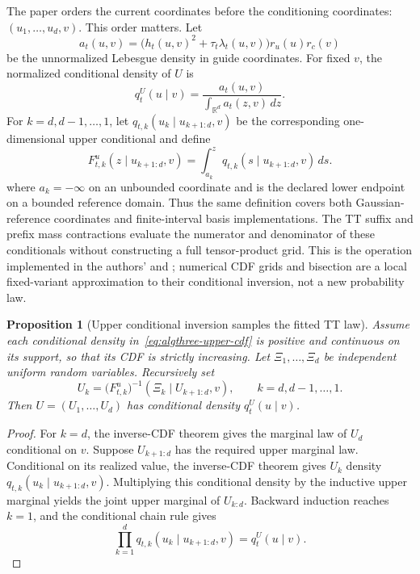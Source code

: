 \documentclass[11pt]{article}
\newtheorem{proposition}{Proposition}
\begin{document}
The paper orders the current coordinates before the conditioning coordinates:
$(u_1,\ldots,u_d,v)$.  This order matters.  Let
\begin{equation}
 a_t(u,v)=\bigl(h_t(u,v)^2+\tau_t\lambda_t(u,v)\bigr)r_u(u)r_c(v)
 \label{eq:algthree-lebesgue-amplitude-density}
\end{equation}
be the unnormalized Lebesgue density in guide coordinates.  For fixed $v$,
the normalized conditional density of $U$ is
\begin{equation}
 q_t^U(u\mid v)
 =\frac{a_t(u,v)}{\displaystyle\int_{\mathbb R^d}a_t(z,v)\,dz}.
 \label{eq:algthree-guide-conditional}
\end{equation}
For $k=d,d-1,\ldots,1$, let
$q_{t,k}(u_k\mid u_{k+1:d},v)$ be the corresponding one-dimensional upper
conditional and define
\begin{equation}
 F_{t,k}^u(z\mid u_{k+1:d},v)
 =\int_{a_k}^{z}
 q_{t,k}(s\mid u_{k+1:d},v)\,ds.
 \label{eq:algthree-upper-cdf}
\end{equation}
where $a_k=-\infty$ on an unbounded coordinate and is the declared lower
endpoint on a bounded reference domain.  Thus the same definition covers both
Gaussian-reference coordinates and finite-interval basis implementations.
The TT suffix and prefix mass contractions evaluate the numerator and
denominator of these conditionals without constructing a full tensor-product
grid.  This is the operation implemented in the authors'
 and
; numerical CDF grids and bisection are a
local fixed-variant approximation to their conditional inversion, not a new
probability law.

\begin{proposition}[Upper conditional inversion samples the fitted TT law]
\label{prop:algthree-upper-kr}
Assume each conditional density in~\eqref{eq:algthree-upper-cdf} is positive
and continuous on its support, so that its CDF is strictly increasing.  Let
$\Xi_1,\ldots,\Xi_d$ be independent uniform random variables.  Recursively set
\begin{equation}
 U_k=\bigl(F_{t,k}^u\bigr)^{-1}
       (\Xi_k\mid U_{k+1:d},v),
 \qquad k=d,d-1,\ldots,1.
 \label{eq:algthree-upper-inverse}
\end{equation}
Then $U=(U_1,\ldots,U_d)$ has conditional density $q_t^U(u\mid v)$.
\end{proposition}

\begin{proof}
For $k=d$, the inverse-CDF theorem gives the marginal law of $U_d$ conditional
on $v$.  Suppose $U_{k+1:d}$ has the required upper marginal law.  Conditional
on its realized value, the inverse-CDF theorem gives $U_k$ density
$q_{t,k}(u_k\mid u_{k+1:d},v)$.  Multiplying this conditional density by the
inductive upper marginal yields the joint upper marginal of $U_{k:d}$.
Backward induction reaches $k=1$, and the conditional chain rule gives
\[
 \prod_{k=1}^{d}q_{t,k}(u_k\mid u_{k+1:d},v)
 =q_t^U(u\mid v).
\]
\end{proof}
\end{document}
